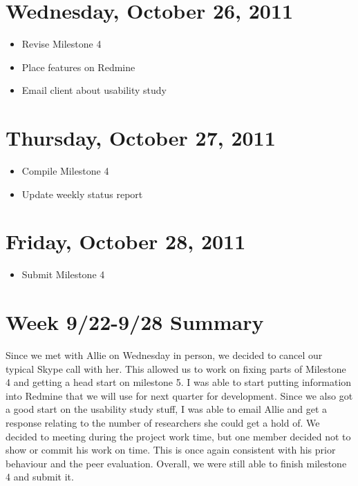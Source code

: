 \documentclass{article}
\begin{document}
\section{Wednesday, October 26, 2011}
\begin{itemize}
\item Revise Milestone 4
\item Place features on Redmine
\item Email client about usability study
\end{itemize}

\section{Thursday, October 27, 2011}
\begin{itemize}
\item Compile Milestone 4
\item Update weekly status report
\end{itemize}

\section{Friday, October 28, 2011}
\begin{itemize}
\item Submit Milestone 4
\end{itemize}

\section*{Week 9/22-9/28 Summary}
Since we met with Allie on Wednesday in person, we decided to cancel our typical Skype call with her. This allowed us to work on fixing parts of Milestone 4 and getting a head start on milestone 5. I was able to start putting information into Redmine that we will use for next quarter for development. Since we also got a good start on the usability study stuff, I was able to email Allie and get a response relating to the number of researchers she could get a hold of. We decided to meeting during the project work time, but one member decided not to show or commit his work on time. This is once again consistent with his prior behaviour and the peer evaluation. Overall, we were still able to finish milestone 4 and submit it.
\end{document}
